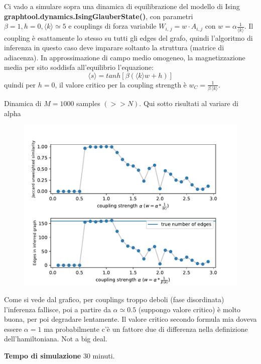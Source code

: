 \documentclass{article}
\begin{document}
Ci vado a simulare sopra una dinamica di equilibrazione del modello di Ising \textbf{graphtool.dynamics.IsingGlauberState()}, con parametri $\beta = 1, h=0, \langle k \rangle \simeq 5 $ e couplings di forza variabile $W_{i,\,j}= w\cdot A_{i,j}$ con $w= \alpha \frac{1}{\langle k \rangle}$. Il coupling è esattamente lo stesso su tutti gli edges del grafo, quindi l'algoritmo di inferenza in questo caso deve imparare soltanto la struttura (matrice di adiacenza). 
In approssimazione di campo medio omogeneo, la magnetizzazione media per sito soddisfa all'equilibrio l'equazione:
\begin{equation}
    \langle s \rangle = tanh[\beta (\langle k \rangle w  + h)]
\end{equation}
quindi per $h= 0$, il valore critico per la coupling strength è $w_C = \frac{1}{\beta\, \langle k \rangle}$.

Dinamica di $M = 1000$ samples $(>> N)$. Qui sotto risultati al variare di alpha
\begin{figure}[H]
    \centering
    \includegraphics[width=\linewidth]{images/coupling.pdf}
    \caption{}
    \label{fig:enter-label}
\end{figure}
Come si vede dal grafico, per couplings troppo deboli (fase disordinata) l'inferenza fallisce, poi a partire da $\alpha \simeq 0.5$ (suppongo valore critico) è molto buona, per poi degradare lentamente.
Il valore critico secondo formula mia doveva essere $\alpha = 1$ ma probabilmente c'è un fattore due di differenza nella definizione dell'hamiltoniana. Not a big deal.

\textbf{Tempo di simulazione} 30 minuti.
\end{document}
